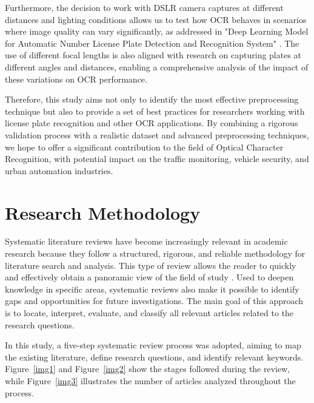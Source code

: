 \documentclass[conference]{IEEEtran}
\begin{document}
	Furthermore, the decision to work with DSLR camera captures at different distances and lighting conditions allows us to test how OCR behaves in scenarios where image quality can vary significantly, as addressed in "Deep Learning Model for Automatic Number License Plate Detection and Recognition System" \cite{b3}. The use of different focal lengths is also aligned with research on capturing plates at different angles and distances, enabling a comprehensive analysis of the impact of these variations on OCR performance.
	
	Therefore, this study aims not only to identify the most effective preprocessing technique but also to provide a set of best practices for researchers working with license plate recognition and other OCR applications. By combining a rigorous validation process with a realistic dataset and advanced preprocessing techniques, we hope to offer a significant contribution to the field of Optical Character Recognition, with potential impact on the traffic monitoring, vehicle security, and urban automation industries.
	
	\section{Research Methodology}
	
	Systematic literature reviews have become increasingly relevant in academic research because they follow a structured, rigorous, and reliable methodology for literature search and analysis. This type of review allows the reader to quickly and effectively obtain a panoramic view of the field of study \cite{b4}. Used to deepen knowledge in specific areas, systematic reviews also make it possible to identify gaps and opportunities for future investigations. The main goal of this approach is to locate, interpret, evaluate, and classify all relevant articles related to the research questions.
	
	In this study, a five-step systematic review process was adopted, aiming to map the existing literature, define research questions, and identify relevant keywords. Figure~\ref{img1} and Figure~\ref{img2} show the stages followed during the review, while Figure~\ref{img3} illustrates the number of articles analyzed throughout the process.
	
\end{document}
